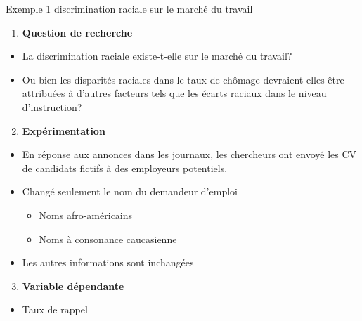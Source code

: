 \documentclass[ignorenonframetext,]{beamer}
\providecommand{\tightlist}{%
  \setlength{\itemsep}{0pt}\setlength{\parskip}{0pt}}
\begin{document}
\begin{frame}{Exemple 1 discrimination raciale sur le marché du travail}
\protect\hypertarget{exemple-1-discrimination-raciale-sur-le-marche-du-travail}{}

\begin{enumerate}
\tightlist
\item
  \textbf{Question de recherche}
\end{enumerate}

\begin{itemize}
\tightlist
\item
  La discrimination raciale existe-t-elle sur le marché du travail?
\item
  Ou bien les disparités raciales dans le taux de chômage
  devraient-elles être attribuées à d'autres facteurs tels que les
  écarts raciaux dans le niveau d'instruction?
\end{itemize}

\begin{enumerate}
\setcounter{enumi}{1}
\tightlist
\item
  \textbf{Expérimentation}
\end{enumerate}

\begin{itemize}
\tightlist
\item
  En réponse aux annonces dans les journaux, les chercheurs ont envoyé
  les CV de candidats fictifs à des employeurs potentiels.
\item
  Changé seulement le nom du demandeur d'emploi

  \begin{itemize}
  \tightlist
  \item
    Noms afro-américains
  \item
    Noms à consonance caucasienne
  \end{itemize}
\item
  Les autres informations sont inchangées
\end{itemize}

\begin{enumerate}
\setcounter{enumi}{2}
\tightlist
\item
  \textbf{Variable dépendante}
\end{enumerate}

\begin{itemize}
\tightlist
\item
  Taux de rappel
\end{itemize}

\end{frame}
\end{document}
